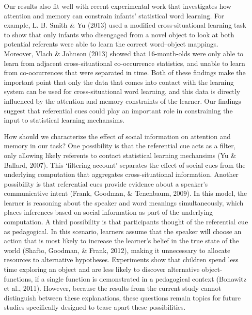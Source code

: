 \documentclass[a4paper,man,floatsintext]{apa6}
\begin{document}
Our results also fit well with recent experimental work that
investigates how attention and memory can constrain infants' statistical
word learning. For example, L. B. Smith \& Yu (2013) used a modified
cross-situational learning task to show that only infants who disengaged
from a novel object to look at both potential referents were able to
learn the correct word--object mappings. Moreover, Vlach \& Johnson
(2013) showed that 16-month-olds were only able to learn from adjacent
cross-situational co-occurrence statistics, and unable to learn from
co-occurrences that were separated in time. Both of these findings make
the important point that only the data that comes into contact with the
learning system can be used for cross-situational word learning, and
this data is directly influenced by the attention and memory constraints
of the learner. Our findings suggest that referential cues could play an
important role in constraining the input to statistical learning
mechansims.

How should we characterize the effect of social information on attention
and memory in our task? One possibility is that the referential cue acts
as a filter, only allowing likely referents to contact statistical
learning mechansims (Yu \& Ballard, 2007). This `filtering account'
separates the effect of social cues from the underlying computation that
aggregates cross-situational information. Another possibility is that
referential cues provide evidence about a speaker's communicative intent
(Frank, Goodman, \& Tenenbaum, 2009). In this model, the learner is
reasoning about the speaker and word meanings simultaneously, which
places inferences based on social information as part of the underlying
computation. A third possibility is that participants thought of the
referential cue as pedagogical. In this scenario, learners assume that
the speaker will choose an action that is most likely to increase the
learner's belief in the true state of the world (Shafto, Goodman, \&
Frank, 2012), making it unnecessary to allocate resources to alternative
hypotheses. Experiments show that children spend less time exploring an
object and are less likely to discover alternative object-functions, if
a single function is demonstrated in a pedagogical context (Bonawitz et
al., 2011). However, because the results from the current study cannot
distinguish between these explanations, these questions remain topics
for future studies specifically designed to tease apart these
possibilities.
\end{document}

